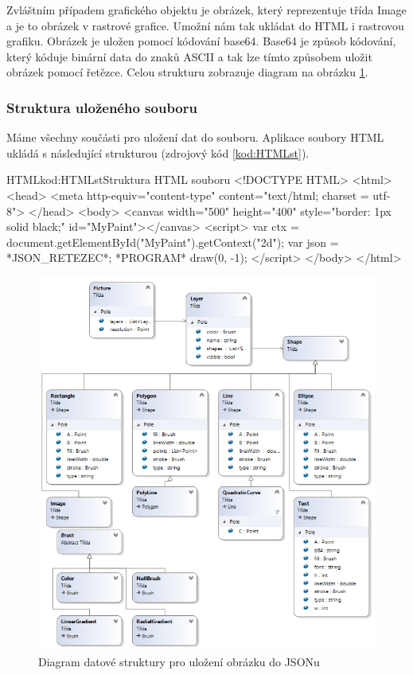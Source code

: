\documentclass[
  field=inf,
  biblatex,
  glossaries,
  index
]{kidiplom}
\begin{document}
Zvláštním případem grafického objektu je obrázek, který reprezentuje třída Image a je to obrázek v rastrové grafice. Umožní nám tak ukládat do HTML i rastrovou grafiku. Obrázek je uložen pomocí kódování base64. Base64 je způsob kódování, který kóduje binární data do znaků ASCII a tak lze tímto způsobem uložit obrázek pomocí řetězce. Celou strukturu zobrazuje diagram na obrázku \ref{fig:json_diag}.

\subsubsection{Struktura uloženého souboru}
Máme všechny součásti pro uložení dat do souboru. Aplikace soubory HTML ukládá s následující strukturou (zdrojový kód \ref{kod:HTMLst}).

\begin{kicode}{HTML}{kod:HTMLst}{Struktura HTML souboru}
<!DOCTYPE HTML>
<html>
  <head>
    <meta http-equiv="content-type" content="text/html; charset = utf-8">
  </head>
  <body>
  <canvas width="500" height="400" style="border: 1px solid black;" id="MyPaint"></canvas>
  <script>
    var ctx = document.getElementById("MyPaint").getContext("2d");
    var json = *JSON_RETEZEC*;
    *PROGRAM*
    draw(0, -1);
  </script>
  </body>
</html>
\end{kicode}


\begin{figure}
\includegraphics[width=15cm]{img/json_diag}
\caption{Diagram datové struktury pro uložení obrázku do JSONu}
\label{fig:json_diag}
\end{figure} 
\end{document}
